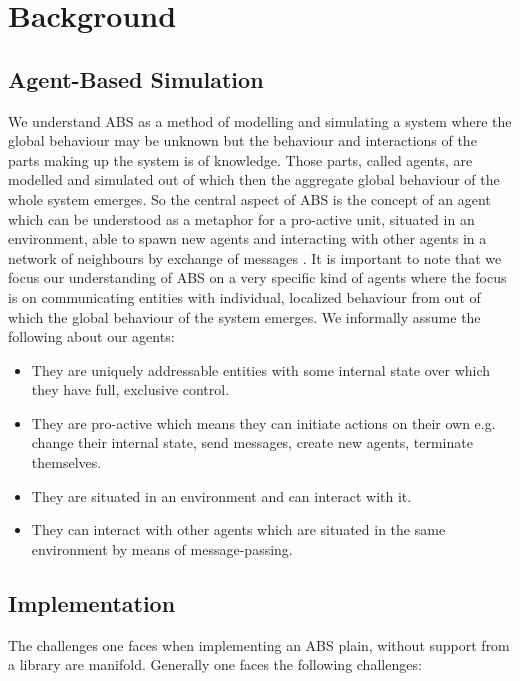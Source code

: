 \section{Background}

\subsection{Agent-Based Simulation}
We understand ABS as a method of modelling and simulating a system where the global behaviour may be unknown but the behaviour and interactions of the parts making up the system is of knowledge. Those parts, called agents, are modelled and simulated out of which then the aggregate global behaviour of the whole system emerges. So the central aspect of ABS is the concept of an agent which can be understood as a metaphor for a pro-active unit, situated in an environment, able to spawn new agents and interacting with other agents in a network of neighbours by exchange of messages \cite{wooldridge_introduction_2009}. It is important to note that we focus our understanding of ABS on a very specific kind of agents where the focus is on communicating entities with individual, localized behaviour from out of which the global behaviour of the system emerges. We informally assume the following about our agents:

\begin{itemize}
	\item They are uniquely addressable entities with some internal state over which they have full, exclusive control.
	\item They are pro-active which means they can initiate actions on their own e.g. change their internal state, send messages, create new agents, terminate themselves.
	\item They are situated in an environment and can interact with it.
	\item They can interact with other agents which are situated in the same environment by means of message-passing.
\end{itemize} 

\subsection{Implementation}
The challenges one faces when implementing an ABS plain, without support from a library are manifold. Generally one faces the following challenges:

